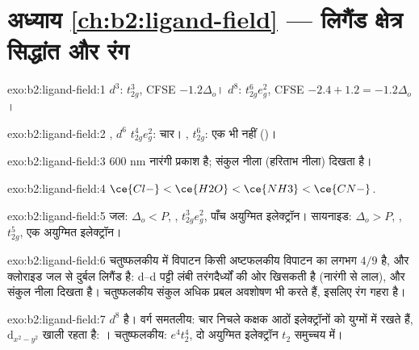 \section*{अध्याय \ref{ch:b2:ligand-field} --- लिगैंड क्षेत्र सिद्धांत और रंग}

\begin{solution}{exo:b2:ligand-field:1}
$d^3$: $t_{2g}^3$, CFSE $-1.2\Delta_o$। $d^8$: $t_{2g}^6e_g^2$, CFSE $-2.4 + 1.2 = -1.2\Delta_o$।
\end{solution}

\begin{solution}{exo:b2:ligand-field:2}
, $d^6$  $t_{2g}^4e_g^2$: चार। , 
$t_{2g}^6$: एक भी नहीं ()।
\end{solution}

\begin{solution}{exo:b2:ligand-field:3}
600 nm नारंगी प्रकाश है; संकुल नीला (हरिताभ नीला) दिखता है।
\end{solution}

\begin{solution}{exo:b2:ligand-field:4}
$\ce{Cl-} < \ce{H2O} < \ce{NH3} < \ce{CN-}$.
\end{solution}

\begin{solution}{exo:b2:ligand-field:5}
जल: $\Delta_o < P$, , $t_{2g}^3e_g^2$, पाँच अयुग्मित इलेक्ट्रॉन। सायनाइड: $\Delta_o > P$,
, $t_{2g}^5$, एक अयुग्मित इलेक्ट्रॉन।
\end{solution}

\begin{solution}{exo:b2:ligand-field:6}
चतुष्फलकीय  में विपाटन किसी अष्टफलकीय विपाटन का लगभग $4/9$ है, और
क्लोराइड जल से दुर्बल लिगैंड है: d–d पट्टी लंबी तरंगदैर्ध्यों की ओर खिसकती है (नारंगी
से लाल), और संकुल नीला दिखता है। चतुष्फलकीय संकुल अधिक प्रबल अवशोषण भी करते हैं,
इसलिए रंग गहरा है।
\end{solution}

\begin{solution}{exo:b2:ligand-field:7}
 $d^8$ है। वर्ग समतलीय: चार निचले कक्षक आठों इलेक्ट्रॉनों को युग्मों में रखते हैं,
$\mathrm d_{x^2-y^2}$ खाली रहता है: । चतुष्फलकीय: $e^4t_2^4$, दो अयुग्मित इलेक्ट्रॉन
$t_2$ समुच्चय में।
\end{solution}

